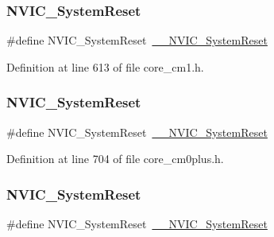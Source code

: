 \subsubsection{\texorpdfstring{N\+V\+I\+C\+\_\+\+System\+Reset}{NVIC\_SystemReset}\hspace{0.1cm}{\footnotesize\ttfamily [2/13]}}
{\footnotesize\ttfamily \#define N\+V\+I\+C\+\_\+\+System\+Reset~\hyperlink{group___c_m_s_i_s___core___n_v_i_c_functions_ga0d9aa2d30fa54b41eb780c16e35b676c}{\+\_\+\+\_\+\+N\+V\+I\+C\+\_\+\+System\+Reset}}



Definition at line 613 of file core\+\_\+cm1.\+h.

\mbox{\label{group___c_m_s_i_s___core___n_v_i_c_functions_ga6aa0367d3642575610476bf0366f0c48}} 
\subsubsection{\texorpdfstring{N\+V\+I\+C\+\_\+\+System\+Reset}{NVIC\_SystemReset}\hspace{0.1cm}{\footnotesize\ttfamily [3/13]}}
{\footnotesize\ttfamily \#define N\+V\+I\+C\+\_\+\+System\+Reset~\hyperlink{group___c_m_s_i_s___core___n_v_i_c_functions_ga0d9aa2d30fa54b41eb780c16e35b676c}{\+\_\+\+\_\+\+N\+V\+I\+C\+\_\+\+System\+Reset}}



Definition at line 704 of file core\+\_\+cm0plus.\+h.

\mbox{\label{group___c_m_s_i_s___core___n_v_i_c_functions_ga6aa0367d3642575610476bf0366f0c48}} 
\subsubsection{\texorpdfstring{N\+V\+I\+C\+\_\+\+System\+Reset}{NVIC\_SystemReset}\hspace{0.1cm}{\footnotesize\ttfamily [4/13]}}
{\footnotesize\ttfamily \#define N\+V\+I\+C\+\_\+\+System\+Reset~\hyperlink{group___c_m_s_i_s___core___n_v_i_c_functions_ga0d9aa2d30fa54b41eb780c16e35b676c}{\+\_\+\+\_\+\+N\+V\+I\+C\+\_\+\+System\+Reset}}



